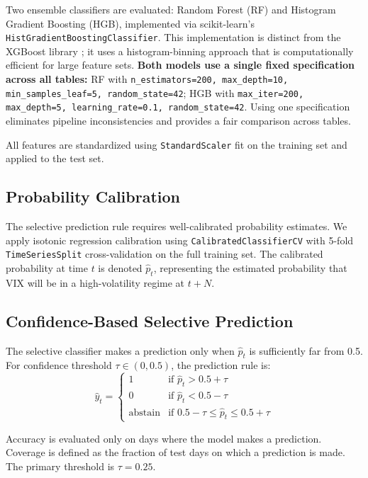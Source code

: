 \documentclass[12pt]{article}
\begin{document}
Two ensemble classifiers are evaluated: Random Forest (RF) and Histogram Gradient Boosting (HGB), implemented via scikit-learn's \texttt{HistGradientBoostingClassifier}. This implementation is distinct from the XGBoost library \citep{chen2016}; it uses a histogram-binning approach that is computationally efficient for large feature sets. \textbf{Both models use a single fixed specification across all tables:} RF with \texttt{n\_estimators=200, max\_depth=10, min\_samples\_leaf=5, random\_state=42}; HGB with \texttt{max\_iter=200, max\_depth=5, learning\_rate=0.1, random\_state=42}. Using one specification eliminates pipeline inconsistencies and provides a fair comparison across tables.

All features are standardized using \texttt{StandardScaler} fit on the training set and applied to the test set.

\subsection{Probability Calibration}

The selective prediction rule requires well-calibrated probability estimates. We apply isotonic regression calibration using \texttt{CalibratedClassifierCV} with 5-fold \texttt{TimeSeriesSplit} cross-validation on the full training set. The calibrated probability at time $t$ is denoted $\hat{p}_t$, representing the estimated probability that VIX will be in a high-volatility regime at $t + N$.

\subsection{Confidence-Based Selective Prediction}

The selective classifier makes a prediction only when $\hat{p}_t$ is sufficiently far from 0.5. For confidence threshold $\tau \in (0, 0.5)$, the prediction rule is:
\begin{equation}
    \hat{y}_t = \begin{cases}
        1 & \text{if } \hat{p}_t > 0.5 + \tau \\
        0 & \text{if } \hat{p}_t < 0.5 - \tau \\
        \text{abstain} & \text{if } 0.5 - \tau \leq \hat{p}_t \leq 0.5 + \tau
    \end{cases}
    \label{eq:selective}
\end{equation}

Accuracy is evaluated only on days where the model makes a prediction. Coverage is defined as the fraction of test days on which a prediction is made. The primary threshold is $\tau = 0.25$.
\end{document}
